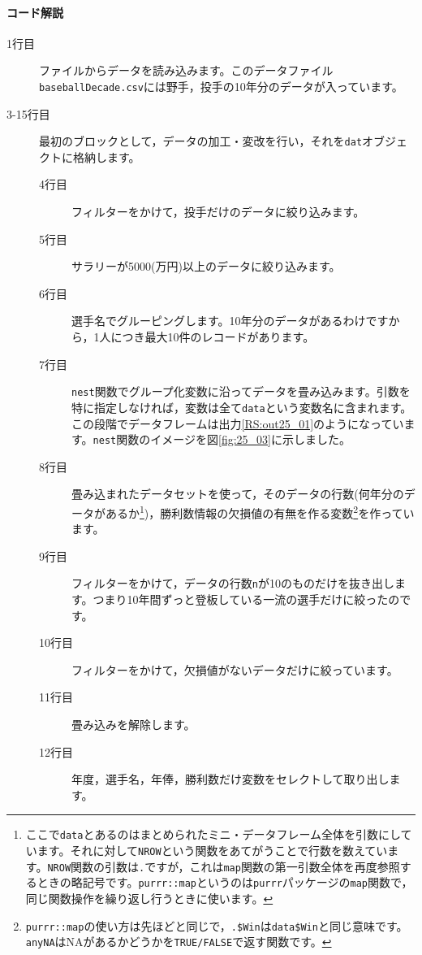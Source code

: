 \documentclass{ltjsbook}
\begin{document}
\paragraph{コード解説}
\begin{description}
    \item[1行目] ファイルからデータを読み込みます。このデータファイル\verb|baseballDecade.csv|には野手，投手の10年分のデータが入っています。
    \item[3-15行目] 最初のブロックとして，データの加工・変改を行い，それを\verb|dat|オブジェクトに格納します。
        \begin{description}
            \item[4行目] フィルターをかけて，投手だけのデータに絞り込みます。
            \item[5行目] サラリーが5000(万円)以上のデータに絞り込みます。
            \item[6行目] 選手名でグルーピングします。10年分のデータがあるわけですから，1人につき最大10件のレコードがあります。
            \item[7行目] \verb|nest|関数でグループ化変数に沿ってデータを畳み込みます。引数を特に指定しなければ，変数は全て\verb|data|という変数名に含まれます。この段階でデータフレームは出力\ref{RS:out25_01}のようになっています。\verb|nest|関数のイメージを図\ref{fig:25_03}に示しました。
            \item[8行目] 畳み込まれたデータセットを使って，そのデータの行数(何年分のデータがあるか\footnote{ここで\verb|data|とあるのはまとめられたミニ・データフレーム全体を引数にしています。それに対して\verb|NROW|という関数をあてがうことで行数を数えています。\verb|NROW|関数の引数は\verb|.|ですが，これは\verb|map|関数の第一引数全体を再度参照するときの略記号です。\verb|purrr::map|というのは\verb|purrr|パッケージの\verb|map|関数で，同じ関数操作を繰り返し行うときに使います。})，勝利数情報の欠損値の有無を作る変数\footnote{\verb|purrr::map|の使い方は先ほどと同じで，\verb|.$Win|は\verb|data$Win|と同じ意味です。\verb|anyNA|はNAがあるかどうかを\verb|TRUE/FALSE|で返す関数です。}を作っています。
            \item[9行目] フィルターをかけて，データの行数\verb|n|が10のものだけを抜き出します。つまり10年間ずっと登板している一流の選手だけに絞ったのです。
            \item[10行目] フィルターをかけて，欠損値がないデータだけに絞っています。
            \item[11行目] 畳み込みを解除します。
            \item[12行目] 年度，選手名，年俸，勝利数だけ変数をセレクトして取り出します。

\end{description}
\end{description}
\end{document}
